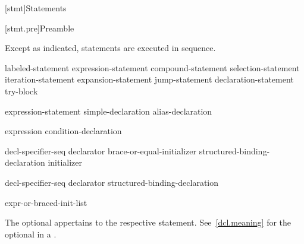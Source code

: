 [stmt]{Statements}%



[stmt.pre]{Preamble}

\pnum
Except as indicated, statements are executed in sequence.

\begin{bnf}
\br
    labeled-statement\br
     expression-statement\br
     compound-statement\br
     selection-statement\br
     iteration-statement\br
     expansion-statement\br
     jump-statement\br
    declaration-statement\br
     try-block
\end{bnf}

\begin{bnf}
\br
    expression-statement\br
    simple-declaration\br
    alias-declaration
\end{bnf}

\begin{bnf}
\br
    expression\br
    condition-declaration
\end{bnf}

\begin{bnf}
\br
     decl-specifier-seq declarator brace-or-equal-initializer\br
    structured-binding-declaration initializer
\end{bnf}

\begin{bnf}
\br
     decl-specifier-seq declarator\br
    structured-binding-declaration
\end{bnf}

\begin{bnf}
\br
    expr-or-braced-init-list
\end{bnf}

The optional  appertains to the respective statement.
See~\ref{dcl.meaning} for the optional  in a
.

